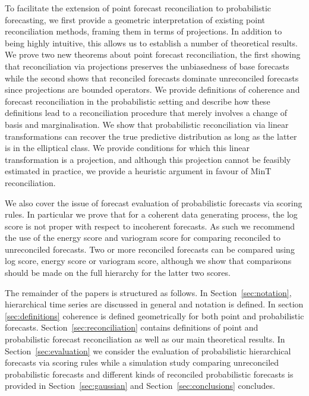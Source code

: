 \documentclass[a4paper, 11pt]{article}
\theoremstyle{theo}
\theoremstyle{definition}
\begin{document}
To facilitate the extension of point forecast reconciliation to probabilistic forecasting, we  first provide a geometric interpretation of existing point reconciliation methods, framing them in terms of projections.  In addition to being highly intuitive, this allows us to establish a number of theoretical results.  We prove two new theorems about point forecast reconciliation, the first showing that reconciliation via projections preserves the unbiasedness of base forecasts while the second shows that reconciled forecasts dominate unreconciled forecasts since projections are bounded operators.  We provide definitions of coherence and forecast reconciliation in the probabilistic setting and describe how these definitions lead to a reconciliation procedure that merely involves a change of basis and marginalisation.  We show that probabilistic reconciliation via linear transformations can recover the true predictive distribution as long as the latter is in the elliptical class.  We provide conditions for which this linear transformation is a projection, and although this projection cannot be feasibly estimated in practice, we provide a heuristic argument in favour of MinT reconciliation. 

We also cover the issue of forecast evaluation of probabilistic forecasts via scoring rules.  In particular we prove that for a coherent data generating process, the log score is not proper with respect to incoherent forecasts.  As such we recommend the use of the energy score and variogram score for comparing reconciled to unreconciled forecasts.  Two or more reconciled forecasts can be compared using log score, energy score or variogram score, although we show that comparisons should be  made on the full hierarchy for the latter two scores.  

The remainder of the papers is  structured as follows.   In Section~\ref{sec:notation}, hierarchical time series are discussed in general and notation is  defined.  In section \ref{sec:definitions} coherence is defined geometrically for both point and probabilistic forecasts.  Section~\ref{sec:reconciliation} contains definitions of point and probabilistic forecast reconciliation as well as our main theoretical results.  In Section~\ref{sec:evaluation} we consider the evaluation of probabilistic hierarchical forecasts via scoring rules while a simulation study comparing unreconciled probabilistic forecasts and different kinds of reconciled probabilistic forecasts is provided in Section~\ref{sec:gaussian} and Section~\ref{sec:conclusions} concludes.
\end{document}
